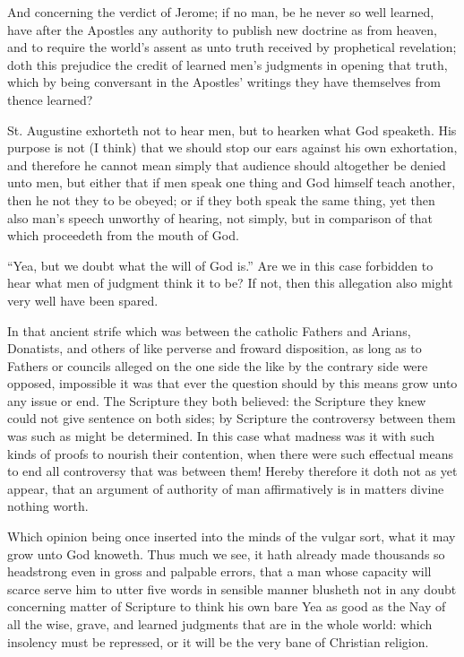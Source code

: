 And concerning the verdict of Jerome; if no man, be he never so well learned, have after the Apostles any authority to publish new doctrine as from heaven, and to require the world’s assent as unto truth received by prophetical revelation; doth this prejudice the credit of learned men’s judgments in opening that truth, which by being conversant in the Apostles’ writings they have themselves from thence learned?

St. Augustine exhorteth not to hear men, but to hearken what God speaketh. His purpose is not (I think) that we should stop our ears against his own exhortation, and therefore he cannot mean simply that audience should altogether be denied unto men, but either that if men speak one thing and God himself teach another, then he not they to be obeyed; or if they both speak the same thing, yet then also man’s speech unworthy of hearing, not simply, but in comparison of that which proceedeth from the mouth of God.

“Yea, but we doubt what the will of God is.” Are we in this case forbidden to hear what men of judgment think it to be? If not, then this allegation also might very well have been spared.

In that ancient strife which was between the catholic Fathers and Arians, Donatists, and others of like perverse and froward disposition, as long as to Fathers or councils alleged on the one side the like by the contrary side were opposed, impossible it was that ever the question should by this means grow unto any issue or end. The Scripture they both believed: the Scripture they knew could not give  sentence on both sides; by Scripture the controversy between them was such as might be determined. In this case what madness was it with such kinds of proofs to nourish their contention, when there were such effectual means to end all controversy that was between them! Hereby therefore it doth not as yet appear, that an argument of authority of man affirmatively is in matters divine nothing worth.

Which opinion being once inserted into the minds of the vulgar sort, what it may grow unto God knoweth. Thus much we see, it hath already made thousands so headstrong even in gross and palpable errors, that a man whose capacity will scarce serve him to utter five words in sensible manner blusheth not in any doubt concerning matter of Scripture to think his own bare Yea as good as the Nay of all the wise, grave, and learned judgments that are in the whole world: which insolency must be repressed, or it will be the very bane of Christian religion.

